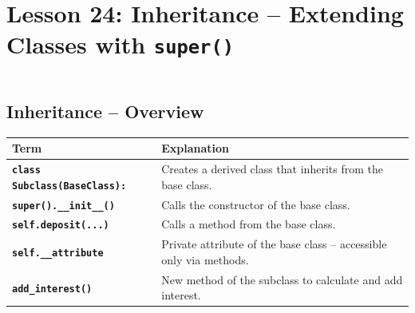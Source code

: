 \documentclass[a4paper,11pt]{article}
\begin{document}
	
\section{Lesson 24: Inheritance – Extending Classes with \texttt{super()}}
\inputminted{python}{Python_Files/inheritance_guid.py}

\vspace{1em}
\subsection*{Inheritance – Overview}

\renewcommand{\arraystretch}{1.4}
\begin{tabular}{>{\bfseries}p{4.5cm} p{9cm}}
	\toprule
	Term & Explanation \\
	\midrule
	\texttt{class Subclass(BaseClass):} & Creates a derived class that inherits from the base class. \\
	\texttt{super().\_\_init\_\_()} & Calls the constructor of the base class. \\
	\texttt{self.deposit(...)} & Calls a method from the base class. \\
	\texttt{self.\_\_attribute} & Private attribute of the base class – accessible only via methods. \\
	\texttt{add\_interest()} & New method of the subclass to calculate and add interest. \\
	\bottomrule
\end{tabular}

	

	
	
	
	
\end{document}

